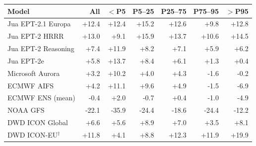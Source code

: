 \begin{tabular}{lrrrrrr}
\toprule
Model & All & $<$P5 & P5--25 & P25--75 & P75--95 & $>$P95 \\
\midrule
Jua EPT-2.1 Europa & +12.4 & +12.4 & +15.2 & +12.6 & +9.8 & +12.8 \\
Jua EPT-2 HRRR & +13.0 & +9.1 & +15.9 & +13.7 & +10.6 & +14.5 \\
Jua EPT-2 Reasoning & +7.4 & +11.9 & +8.2 & +7.1 & +5.9 & +6.2 \\
Jua EPT-2e & +5.8 & +13.7 & +8.4 & +6.1 & +1.3 & +0.4 \\
Microsoft Aurora & +3.2 & +10.2 & +4.0 & +4.3 & -1.6 & -0.2 \\
ECMWF AIFS & +4.2 & +11.1 & +9.6 & +4.9 & -1.5 & -6.9 \\
ECMWF ENS (mean) & -0.4 & +2.0 & -0.7 & +0.4 & -1.0 & -4.9 \\
NOAA GFS & -22.1 & -35.9 & -24.4 & -18.6 & -24.4 & -12.2 \\
DWD ICON Global & +6.6 & +5.6 & +8.9 & +7.0 & +3.5 & +8.1 \\
DWD ICON-EU$^{\dagger}$ & +11.8 & +4.1 & +8.8 & +12.3 & +11.9 & +19.9 \\
\bottomrule
\end{tabular}
